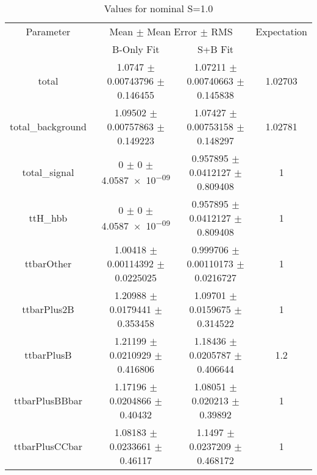 \begin{table}
\centering
\caption{Values for nominal S=1.0}
\begin{tabular}{cccc}
\toprule
Parameter & \multicolumn{2}{c}{Mean $\pm$ Mean Error $\pm$ RMS} & Expectation\\
 & B-Only Fit & S+B Fit & \\
\midrule
total & \num{1.0747} $\pm$ \num{0.00743796} $\pm$ \num{0.146455} & \num{1.07211} $\pm$ \num{0.00740663} $\pm$ \num{0.145838} & \num{1.02703}\\
total\_background & \num{1.09502} $\pm$ \num{0.00757863} $\pm$ \num{0.149223} & \num{1.07427} $\pm$ \num{0.00753158} $\pm$ \num{0.148297} & \num{1.02781}\\
total\_signal & \num{0} $\pm$ \num{0} $\pm$ \num{4.0587e-09} & \num{0.957895} $\pm$ \num{0.0412127} $\pm$ \num{0.809408} & \num{1}\\
ttH\_hbb & \num{0} $\pm$ \num{0} $\pm$ \num{4.0587e-09} & \num{0.957895} $\pm$ \num{0.0412127} $\pm$ \num{0.809408} & \num{1}\\
ttbarOther & \num{1.00418} $\pm$ \num{0.00114392} $\pm$ \num{0.0225025} & \num{0.999706} $\pm$ \num{0.00110173} $\pm$ \num{0.0216727} & \num{1}\\
ttbarPlus2B & \num{1.20988} $\pm$ \num{0.0179441} $\pm$ \num{0.353458} & \num{1.09701} $\pm$ \num{0.0159675} $\pm$ \num{0.314522} & \num{1}\\
ttbarPlusB & \num{1.21199} $\pm$ \num{0.0210929} $\pm$ \num{0.416806} & \num{1.18436} $\pm$ \num{0.0205787} $\pm$ \num{0.406644} & \num{1.2}\\
ttbarPlusBBbar & \num{1.17196} $\pm$ \num{0.0204866} $\pm$ \num{0.40432} & \num{1.08051} $\pm$ \num{0.020213} $\pm$ \num{0.39892} & \num{1}\\
ttbarPlusCCbar & \num{1.08183} $\pm$ \num{0.0233661} $\pm$ \num{0.46117} & \num{1.1497} $\pm$ \num{0.0237209} $\pm$ \num{0.468172} & \num{1}\\
\bottomrule
\end{tabular}
\end{table}